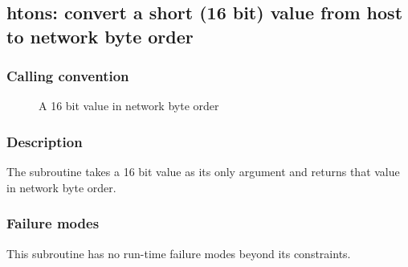 \clearpage
{}
{}
\label{subr:htons}
\subsection*{htons: convert a short (16 bit) value from host to network
byte order}

\subsubsection*{Calling convention}

\begin{description}
\item[] A 16 bit value in network byte order
\end{description}

\subsubsection*{Description}

The  subroutine takes a 16 bit value as its only
argument and returns that value in network byte order.

\subsubsection*{Failure modes}

This subroutine has no run-time failure modes beyond its constraints.
